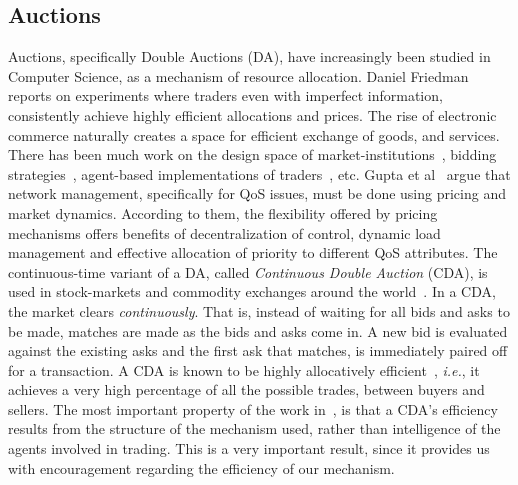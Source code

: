 \documentclass[10pt,journal,compsoc]{IEEEtran}
\begin{document}
\subsection{Auctions}
Auctions, specifically Double Auctions (DA), have increasingly been studied in Computer Science, as a mechanism of resource allocation. Daniel Friedman~\cite{Freidman1993Double} reports on experiments where traders even with imperfect information, consistently achieve highly efficient allocations and prices. The rise of electronic commerce naturally creates a space for efficient exchange of goods, and services. There has been much work on the design space of market-institutions~\cite{Wurman2001Parametrization, Niu2008Characterizing}, bidding strategies~\cite{Cliff1998Simple, Roth1995Learning}, agent-based implementations of traders~\cite{Jennings2000Automated, He2003SouthamptonTAC, He2003agent-mediated, Niu2010What}, etc. Gupta et al~\cite{Gupta1999economics} argue that network management, specifically for QoS issues, must be done using pricing and market dynamics. According to them, the flexibility offered by pricing mechanisms offers benefits of decentralization of control, dynamic load management and effective allocation of priority to different QoS attributes. The continuous-time variant of a DA, called \textit{Continuous Double Auction} (CDA), is used in stock-markets and commodity exchanges around the world~\cite{Klemperer1999Auction}. In a CDA, the market clears \textit{continuously}. That is, instead of waiting for all bids and asks to be made, matches are made as the bids and asks come in. A new bid is evaluated against the existing asks and the first ask that matches, is immediately paired off for a transaction. A CDA is known to be highly allocatively efficient~\cite{Gode1993Allocative}, \textit{i.e.}, it achieves a very high percentage of all the possible trades, between buyers and sellers. The most important property of the work in~\cite{Gode1993Allocative}, is that a CDA's efficiency results from the structure of the mechanism used, rather than intelligence of the agents involved in trading. This is a very important result, since it provides us with encouragement regarding the efficiency of our mechanism.
\end{document}

